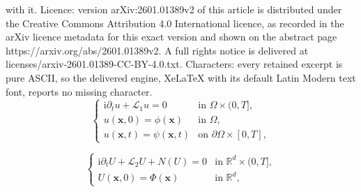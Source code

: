 \documentclass[10pt,a4paper]{amsart}
\begin{document}
with it. Licence: version arXiv:2601.01389v2 of this article is distributed under the Creative Commons Attribution 4.0 International licence, as recorded in the arXiv licence metadata for this exact version and shown on the abstract page https://arxiv.org/abs/2601.01389v2. A full rights notice is delivered at licenses/arxiv-2601.01389-CC-BY-4.0.txt. Characters: every retained excerpt is pure ASCII, so the delivered engine, XeLaTeX with its default Latin Modern text font, reports no missing character.
\begin{equation}\label{1.1}
    \begin{cases}
        \mathrm{i}\partial_t u + \mathcal{L}_1 u = 0 & \text{in } \Omega \times (0,T], \\
        u(\mathbf{x},0) = \phi(\mathbf{x}) & \text{in } \Omega, \\
        u(\mathbf{x},t) = \psi(\mathbf{x},t) & \text{on } \partial\Omega \times [0,T],
    \end{cases}
\end{equation}

\begin{equation}\label{1.2}
    \begin{cases}
        \mathrm{i}\partial_t U + \mathcal{L}_2 U + N(U) = 0 & 	\text{in } \mathbb{R}^{d} 	\times (0,T], \\
        U(\mathbf{x},0) = \Phi(\mathbf{x}) & 	\text{in } \mathbb{R}^d,
    \end{cases}
\end{equation}
\end{document}

